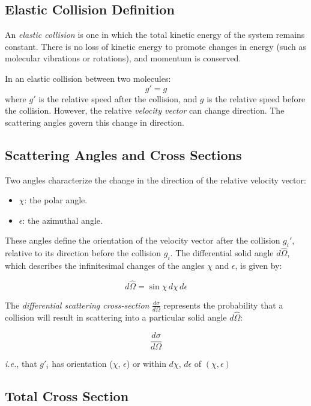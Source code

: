 \documentclass{article}
\begin{document}
\subsection{Elastic Collision Definition}

An \emph{elastic collision} is one in which the total kinetic energy of the system remains constant. There is no loss of kinetic energy to promote changes in energy (such as molecular vibrations or rotations), and momentum is conserved. 

In an elastic collision between two molecules:
\[
g' = g
\]
where \( g' \) is the relative speed after the collision, and \( g \) is the relative speed before the collision. However, the relative \emph{velocity vector} can change direction. The scattering angles govern this change in direction.

\subsection{Scattering Angles and Cross Sections}

Two angles characterize the change in the direction of the relative velocity vector:
\begin{itemize}
    \item \( \chi \): the polar angle.
    \item \( \epsilon \): the azimuthal angle.
\end{itemize}

These angles define the orientation of the velocity vector after the collision $g_i'$, relative to its direction before the collision $g_i$. The differential solid angle \( d\hat{\Omega} \), which describes the infinitesimal changes of the angles $\chi$ and $\epsilon$, is given by:

\[
d\hat{\Omega} = \sin \chi \, d\chi \, d\epsilon
\]

The \emph{differential scattering cross-section} \( \frac{d\sigma}{d\Omega} \) represents the probability that a collision will result in scattering into a particular solid angle \( d \hat{\Omega} \):

\[
\frac{d\sigma}{d\Omega}
\]

\emph{i.e.}, that $g'_i$ has orientation ($\chi$, $\epsilon$) or within $d \chi$, $d \epsilon$ of $\left(\chi, \epsilon\right)$ 

\subsection*{Total Cross Section}
\end{document}
